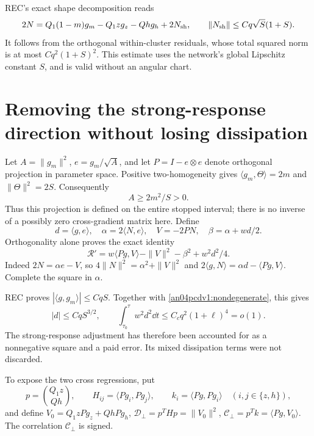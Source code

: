 \documentclass[11pt]{article}
\begin{document}
REC's exact shape decomposition reads
\begin{equation}\label{an04pcdv1:split}
 2N=Q_1(1-m)g_m-Q_1z g_z-Qh g_h+2N_{\rm sh},
 \qquad \|N_{\rm sh}\|\le Cq\sqrt S(1+S).
\end{equation}
It follows from the orthogonal within-cluster residuals, whose
total squared norm is at most $Cq^2(1+S)^2$.
This estimate uses the network's global Lipschitz constant $S$,
and is valid without an angular chart.

\section{Removing the strong-response direction without losing dissipation}
Let $A=\|g_m\|^2$, $e=g_m/\sqrt A$, and let
$P=I-e\otimes e$ denote orthogonal projection in parameter space.
Positive two-homogeneity gives
$\langle g_m,\Theta\rangle=2m$ and $\|\Theta\|^2=2S$.
Consequently
\begin{equation}\label{an04pcdv1:nondegenerate}
 A\ge2m^2/S>0.
\end{equation}
Thus this projection is defined on the entire stopped interval;
there is no inverse of a possibly zero cross-gradient matrix here.
Define
\[
 d=\langle g,e\rangle,\quad \alpha=2\langle N,e\rangle,
 \quad V=-2PN,\quad \beta=\alpha+wd/2.
\]
Orthogonality alone proves the exact identity
\begin{equation}\label{an04pcdv1:exact}
 \mathcal R'=w\langle Pg,V\rangle-\|V\|^2-\beta^2
                         +w^2d^2/4.
\end{equation}
Indeed $2N=\alpha e-V$, so
$4\|N\|^2=\alpha^2+\|V\|^2$ and
$2\langle g,N\rangle=\alpha d-\langle Pg,V\rangle$.
Complete the square in $\alpha$.

REC proves $|\langle g,g_m\rangle|\le CqS$.
Together with \eqref{an04pcdv1:nondegenerate}, this gives
\begin{equation}\label{an04pcdv1:smallparallel}
 |d|\le CqS^{3/2},\qquad
 \int_{\tau_0}^{\tau}w^2d^2\dd t\le C_cq^2(1+\ell)^4=o(1).
\end{equation}
The strong-response adjustment has therefore been accounted for
as a nonnegative square and a paid error. Its mixed dissipation
terms were not discarded.

To expose the two cross regressions, put
\[
 p=\binom{Q_1z}{Qh},\qquad
 H_{ij}=\langle Pg_i,Pg_j\rangle,\qquad
 k_i=\langle Pg,Pg_i\rangle\quad(i,j\in\{z,h\}),
\]
and define
$V_0=Q_1zPg_z+QhPg_h$,
$\mathcal D_\perp=p^THp=\|V_0\|^2$,
$\mathcal C_\perp=p^Tk=\langle Pg,V_0\rangle$.
The correlation $\mathcal C_\perp$ is signed.
\end{document}
